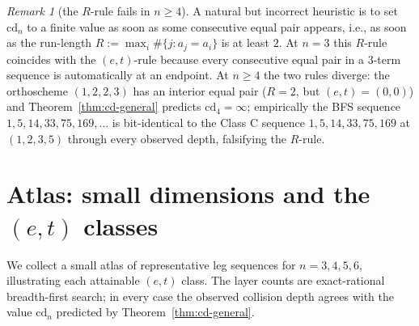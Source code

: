 \documentclass[11pt,a4paper]{article}
\theoremstyle{remark}
\newtheorem{remark}[theorem]{Remark}
\theoremstyle{plain}
\begin{document}
\begin{remark}[the $R$-rule fails in $n \ge 4$]
\label{rem:R-rule}
A natural but incorrect heuristic is to set $\mathrm{cd}_n$ to a
finite value as soon as some consecutive equal pair appears, i.e.,
as soon as the run-length $R := \max_i \#\{j : a_j = a_i\}$ is at
least $2$.  At $n = 3$ this $R$-rule coincides with the $(e, t)$-rule
because every consecutive equal pair in a $3$-term sequence is
automatically at an endpoint.  At $n \ge 4$ the two rules diverge:
the orthoscheme $(1, 2, 2, 3)$ has an interior equal pair
($R = 2$, but $(e, t) = (0, 0)$) and
Theorem~\ref{thm:cd-general} predicts $\mathrm{cd}_4 = \infty$;
empirically the BFS sequence $1, 5, 14, 33, 75, 169, \ldots$ is
bit-identical to the Class C sequence $1, 5, 14, 33, 75, 169$ at
$(1, 2, 3, 5)$ through every observed depth, falsifying the
$R$-rule.
\end{remark}

\section{Atlas: small dimensions and the $(e, t)$ classes}\label{sec:atlas}

We collect a small atlas of representative leg sequences for
$n = 3, 4, 5, 6$, illustrating each attainable $(e, t)$ class.
The layer counts are exact-rational breadth-first search; in every
case the observed collision depth agrees with the value
$\mathrm{cd}_n$ predicted by Theorem~\ref{thm:cd-general}.
\end{document}
